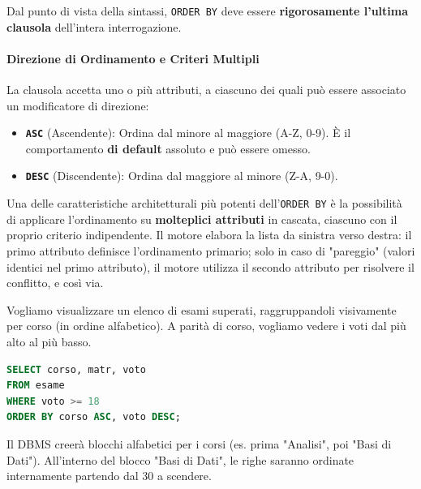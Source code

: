 Dal punto di vista della sintassi, \texttt{ORDER BY} deve essere \textbf{rigorosamente l'ultima clausola} dell'intera interrogazione.

\paragraph{Direzione di Ordinamento e Criteri Multipli}
La clausola accetta uno o più attributi, a ciascuno dei quali può essere associato un modificatore di direzione:
\begin{itemize}
    \item \textbf{\texttt{ASC}} (Ascendente): Ordina dal minore al maggiore (A-Z, 0-9). È il comportamento \textbf{di default} assoluto e può essere omesso.
    \item \textbf{\texttt{DESC}} (Discendente): Ordina dal maggiore al minore (Z-A, 9-0).
\end{itemize}

Una delle caratteristiche architetturali più potenti dell'\texttt{ORDER BY} è la possibilità di applicare l'ordinamento su \textbf{molteplici attributi} in cascata, ciascuno con il proprio criterio indipendente. Il motore elabora la lista da sinistra verso destra: il primo attributo definisce l'ordinamento primario; solo in caso di "pareggio" (valori identici nel primo attributo), il motore utilizza il secondo attributo per risolvere il conflitto, e così via.

\begin{example}
Vogliamo visualizzare un elenco di esami superati, raggruppandoli visivamente per corso (in ordine alfabetico). A parità di corso, vogliamo vedere i voti dal più alto al più basso.

\begin{lstlisting}[language=SQL, basicstyle=\ttfamily\small, keywordstyle=\color{blue}\bfseries]
SELECT corso, matr, voto
FROM esame
WHERE voto >= 18
ORDER BY corso ASC, voto DESC;
\end{lstlisting}
Il DBMS creerà blocchi alfabetici per i corsi (es. prima "Analisi", poi "Basi di Dati"). All'interno del blocco "Basi di Dati", le righe saranno ordinate internamente partendo dal 30 a scendere.
\end{example}

